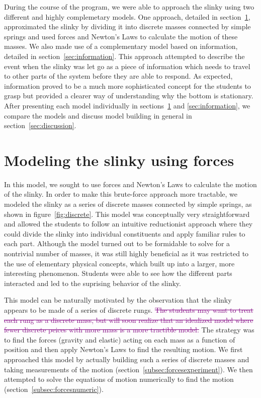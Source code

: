 \documentclass[prb,preprint]{revtex4-1}
\newcommand{\calvin}[2]{\textcolor{purple}{\sout{#1}#2}}
\renewcommand{\sec}[1]{section~\ref{sec:#1}}
\newcommand{\secs}[2]{sections~\ref{sec:#1} and \ref{sec:#2}}
\newcommand{\subsec}[1]{section~\ref{subsec:#1}}
\newcommand{\fig}[1]{figure~\ref{fig:#1}}
\begin{document}
During the course of the program, we were able to approach the slinky using two different
and highly complemetary models.
One approach, detailed in \sec{forces}, approximated
the slinky by dividing it into discrete masses connected by simple springs and used
forces and Newton's Laws to calculate the motion of these masses.
We also made use of a complementary
model based on information, detailed in \sec{information}. This approach attempted
to describe the event when the slinky was let go as a piece of information which
needs to travel to other parts of the system before they are able to respond.
As expected, information proved to be a much more sophisticated concept for the
students to grasp but provided a clearer way of understanding why the bottom
is stationary. After presenting each
model individually in \secs{forces}{information}, we compare the models and
discuss model building in general in \sec{discussion}.

\section{Modeling the slinky using forces}
\label{sec:forces}

In this model, we sought to use forces and Newton's Laws to calculate the
motion of the slinky. In order to make this brute-force approach more tractable, we
modeled the slinky as a series of discrete masses connected by simple springs, as
shown in \fig{discrete}. This
model was conceptually very straightforward and allowed the students to follow an
intuitive reductionist approach where they could divide the slinky into individual
constituents and apply familiar rules to each part. Although the model turned out to
be formidable to solve for a nontrivial number of masses, it was still highly beneficial as it was restricted to the
use of elementary physical concepts, which built up into a larger, more interesting
phenomenon. Students were able to see how the different parts interacted and led
to the suprising behavior of the slinky.

This model can be naturally motivated
by the observation that the slinky appears to be made of a series of discrete rungs. \calvin{The students may want 
to treat each rung as a discrete mass, but will soon realize that an idealized model where fewer discrete peices 
with more mass is a more tractible model.}{}  The strategy  was to find the forces (gravity and elastic) acting on 
each mass as a function of position and then
apply Newton's Laws to find the resulting motion. We first approached this model
by actually building such a series of discrete masses and taking measurements of
the motion (\subsec{forcesexperiment}). We then attempted to solve the equations
of motion numerically to find the motion (\subsec{forcesnumeric}).
\end{document}
